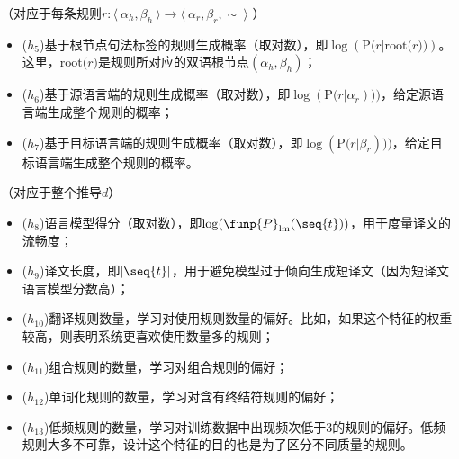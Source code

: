 \vspace{0.5em}
（对应于每条规则$r : \langle\  \alpha_h, \beta_h\ \rangle \to \langle\ \alpha_r, \beta_r, \sim\ \rangle$ ）

\begin{itemize}
\vspace{0.5em}
\item ($h_{5}$)基于根节点句法标签的规则生成概率（取对数），即$\log(\textrm{P(}r|\textrm{root(}r\textrm{))})$。这里，$\textrm{root(}r)$是规则所对应的双语根节点$(\alpha_h,\beta_h)$；
\vspace{0.5em}
\item ($h_{6}$)基于源语言端的规则生成概率（取对数），即$\log(\textrm{P(}r|\alpha_r)))$，给定源语言端生成整个规则的概率；
\vspace{0.5em}
\item ($h_{7}$)基于目标语言端的规则生成概率（取对数），即$\log(\textrm{P(}r|\beta_r)))$，给定目标语言端生成整个规则的概率。
\end{itemize}

\vspace{0.5em}
（对应于整个推导$d$）

\begin{itemize}
\vspace{0.5em}
\item ($h_{8}$)语言模型得分（取对数），即$\log(\funp{P}_{\textrm{lm}}(\seq{t}))$，用于度量译文的流畅度；
\vspace{0.5em}
\item ($h_{9}$)译文长度，即$|\seq{t}|$，用于避免模型过于倾向生成短译文（因为短译文语言模型分数高）；
\vspace{0.5em}
\item ($h_{10}$)翻译规则数量，学习对使用规则数量的偏好。比如，如果这个特征的权重较高，则表明系统更喜欢使用数量多的规则；
\vspace{0.5em}
\item ($h_{11}$)组合规则的数量，学习对组合规则的偏好；
\vspace{0.5em}
\item ($h_{12}$)单词化规则的数量，学习对含有终结符规则的偏好；
\vspace{0.5em}
\item ($h_{13}$)低频规则的数量，学习对训练数据中出现频次低于3的规则的偏好。低频规则大多不可靠，设计这个特征的目的也是为了区分不同质量的规则。
\end{itemize}

\vspace{0.5em}

